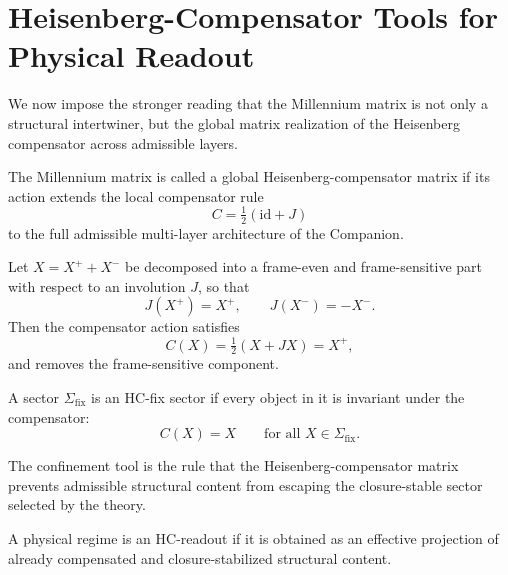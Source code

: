 \section{Heisenberg-Compensator Tools for Physical Readout}
\label{app:hc-tools}

\begin{remark}
We now impose the stronger reading that the Millennium matrix is not only a
structural intertwiner, but the global matrix realization of the Heisenberg
compensator across admissible layers.
\end{remark}

\begin{definition}
The Millennium matrix is called a global Heisenberg-compensator matrix if its
action extends the local compensator rule
\[
C=\tfrac12(\mathrm{id}+J)
\]
to the full admissible multi-layer architecture of the Companion.
\end{definition}

\begin{definition}
Let $X=X^+ + X^-$ be decomposed into a frame-even and frame-sensitive part
with respect to an involution $J$, so that
\[
J(X^+) = X^+,
\qquad
J(X^-) = -X^-.
\]
Then the compensator action satisfies
\[
C(X)=\tfrac12(X+JX)=X^+,
\]
and removes the frame-sensitive component.
\end{definition}

\begin{definition}
A sector $\Sigma_{\mathrm{fix}}$ is an HC-fix sector if every object in it is
invariant under the compensator:
\[
C(X)=X
\qquad\text{for all }X\in\Sigma_{\mathrm{fix}}.
\]
\end{definition}

\begin{definition}
The confinement tool is the rule that the Heisenberg-compensator matrix
prevents admissible structural content from escaping the closure-stable sector
selected by the theory.
\end{definition}

\begin{definition}
A physical regime is an HC-readout if it is obtained as an effective
projection of already compensated and closure-stabilized structural content.
\end{definition}

